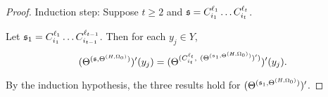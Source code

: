 \begin{appendix}
\begin{proof}
Induction step: Suppose $t \ge 2$ and ${\mathfrak{s} }=C^{\ell_1}_{i_1} \dots C^{\ell_t}_{i_t}$.

Let ${\mathfrak{s} }_1= C^{\ell_1}_{i_1} \dots C^{\ell_{t-1}}_{i_{t-1}}$.  Then for each $y_j \in Y$, 
\[(\sumf^{(\schm,\sumf^{(H,\initval_0)})})'(y_j)=(\sumf^{(C^{\ell_t}_{i_t},\ (\sumf^{(\schm_1, \sumf^{(H,\initval_0)})})')})'(y_j).\] 

By the induction hypothesis, the three results hold for $(\Theta^{({\mathfrak{s} }_1, \Theta^{(H,\Omega_0)})})'$.




\end{proof}
\end{appendix}
